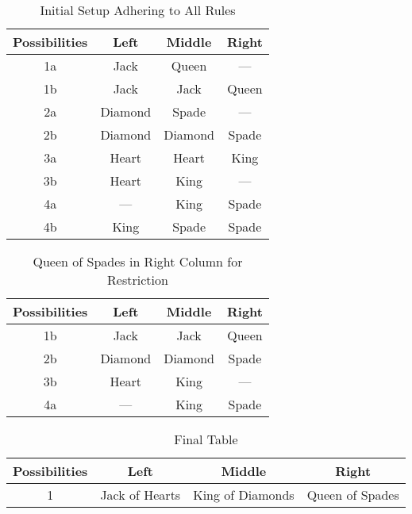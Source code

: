 \documentclass[stu,12pt,floatsintext]{apa7}
\begin{document}
\begin{table}[h!]
	\centering
	\begin{tabular}{cccc}
		\toprule
		\textbf{Possibilities} & \textbf{Left} & \textbf{Middle} & \textbf{Right} \\ \midrule
		1a & Jack & Queen & --- \\ \midrule
		1b & Jack & Jack & Queen \\ \midrule
		2a & Diamond & Spade & --- \\ \midrule
		2b & Diamond & Diamond & Spade  \\ \midrule
		3a & Heart & Heart & King \\ \midrule
		3b & Heart & King & --- \\ \midrule
		4a & --- & King & Spade \\ \midrule
		4b & King & Spade & Spade \\ \bottomrule
	\end{tabular}
	\vspace{0.25cm}
	\caption{Initial Setup Adhering to All Rules}\label{tab:table1}
\end{table}

\begin{table}[h!]
	\centering
	\begin{tabular}{cccc}
		\toprule
		\textbf{Possibilities} & \textbf{Left} & \textbf{Middle} & \textbf{Right} \\ \midrule
		1b & Jack & Jack & Queen \\ \midrule
		2b & Diamond & Diamond & Spade  \\ \midrule
		3b & Heart & King & --- \\ \midrule
		4a & --- & King & Spade \\ \bottomrule
	\end{tabular}
	\vspace{0.25cm}
	\caption{Queen of Spades in Right Column for Restriction}\label{tab:table2}
\end{table}

\begin{table}[h!]
	\centering
	\begin{tabular}{cccc}
		\toprule
		\textbf{Possibilities} & \textbf{Left} & \textbf{Middle} & \textbf{Right} \\ \midrule
		1 & Jack of Hearts & King of Diamonds & Queen of Spades \\
		\bottomrule
	\end{tabular}
	\vspace{0.25cm}
	\caption{Final Table}\label{tab:table3}
\end{table}
\end{document}
